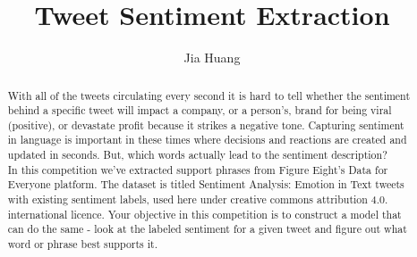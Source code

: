 \documentclass{amsart}
\begin{document}
%
%
\title[Tweet Sentiment Extraction]{ Tweet Sentiment Extraction}%

\author{Jia Huang}
\address[A.~1]{School of Computer Science,\\ 
Xi'an Shiyou University, Shaanxi 710065, China}%


%
%
\date{\gitAuthorDate}%

\begin{abstract}
    With all of the tweets circulating every second it is hard 
    to tell whether the sentiment behind a specific tweet will impact 
    a company, or a person's, brand for being viral (positive), or 
    devastate profit because it strikes a negative tone. Capturing sentiment
     in language is 
    important in these times where decisions and reactions are created and 
    updated in seconds. But, which words actually lead to the sentiment description?
    ~\\
    In this competition we've extracted support phrases from Figure Eight's Data
     for Everyone platform. The dataset is titled Sentiment Analysis: Emotion in 
     Text tweets
      with existing sentiment labels, used here under creative commons attribution
       4.0. international licence. Your objective in this 
      competition is to construct a model that can do the same - look at the 
      labeled sentiment for a given tweet and figure out what
       word or phrase best supports it.
\end{abstract}

\maketitle
\tableofcontents

\newpage



\newpage




\listoftodos
\end{document}
